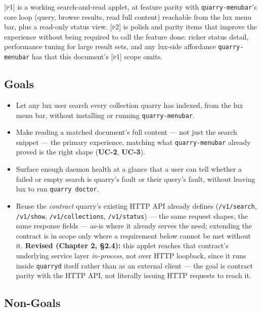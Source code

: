 \documentclass[a4paper,11pt]{report}
\newcommand{\uc}[1]{\textbf{UC-#1}}
\newcommand{\pone}{\textsc{[p1]}}
\newcommand{\ptwo}{\textsc{[p2]}}
\begin{document}
\pone{} is a working search-and-read applet, at feature parity with
\texttt{quarry-menubar}'s core loop (query, browse results, read full
content) reachable from the lux menu bar, plus a read-only status view.
\ptwo{} is polish and parity items that improve the experience without
being required to call the feature done: richer status detail, performance
tuning for large result sets, and any lux-side affordance
\texttt{quarry-menubar} has that this document's \pone{} scope omits.

\subsection{Goals}

\begin{itemize}
  \item Let any lux user search every collection quarry has indexed,
    from the lux menu bar, without installing or running
    \texttt{quarry-menubar}.
  \item Make reading a matched document's full content --- not just the
    search snippet --- the primary experience, matching what
    \texttt{quarry-menubar} already proved is the right shape (\uc{2},
    \uc{3}).
  \item Surface enough daemon health at a glance that a user can tell
    whether a failed or empty search is quarry's fault or their query's
    fault, without leaving lux to run \texttt{quarry doctor}.
  \item Reuse the \emph{contract} quarry's existing HTTP API already
    defines (\texttt{/v1/search}, \texttt{/v1/show},
    \texttt{/v1/collections}, \texttt{/v1/status}) --- the same request
    shapes, the same response fields --- as-is where it already serves the
    need; extending the contract is in scope only where a requirement
    below cannot be met without it. \textbf{Revised (Chapter 2,
    \S2.4):} this applet reaches that contract's underlying service
    layer \emph{in-process}, not over HTTP loopback, since it runs
    inside \texttt{quarryd} itself rather than as an external client ---
    the goal is contract parity with the HTTP API, not literally issuing
    HTTP requests to reach it.
\end{itemize}

\subsection{Non-Goals}
\end{document}
